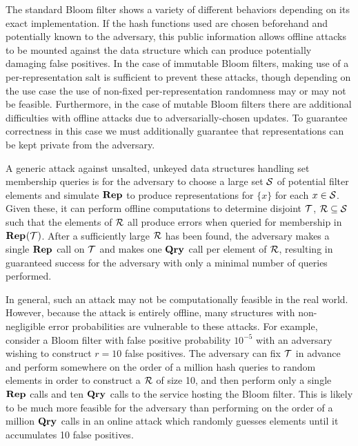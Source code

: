 
%
The standard Bloom filter shows a variety of different behaviors depending on its exact implementation. If the hash functions used are chosen beforehand and potentially known to the adversary, this public information allows offline attacks to be mounted against the data structure which can produce potentially damaging false positives. In the case of immutable Bloom filters, making use of a per-representation salt is sufficient to prevent these attacks, though depending on the use case the use of non-fixed per-representation randomness may or may not be feasible. Furthermore, in the case of mutable Bloom filters there are additional difficulties with offline attacks due to adversarially-chosen updates. To guarantee correctness in this case we must additionally guarantee that representations can be kept private from the adversary.

A generic attack against unsalted, unkeyed data structures handling set membership queries is for the adversary to choose a large set $\mathcal{S}$ of potential filter elements and simulate $\mathbf{Rep}\hspace{0.5pt}$ to produce representations for $\{x\}$ for each $x \in \mathcal{S}$. Given these, it can perform offline computations to determine disjoint $\mathcal{T}$, $\mathcal{R} \subseteq \mathcal{S}$ such that the elements of $\mathcal{R}$ all produce errors when queried for membership in $\mathbf{Rep}\hspace{0.5pt}(\mathcal{T})$. After a sufficiently large $\mathcal{R}$ has been found, the adversary makes a single $\mathbf{Rep}\hspace{0.5pt}$ call on $\mathcal{T}$ and makes one $\mathbf{Qry}\hspace{0.5pt}$ call per element of $\mathcal{R}$, resulting in guaranteed success for the adversary with only a minimal number of queries performed.

In general, such an attack may not be computationally feasible in the real world. However, because the attack is entirely offline, many structures with non-negligible error probabilities are vulnerable to these attacks. For example, consider a Bloom filter with false positive probability $10^{-5}$ with an adversary wishing to construct $r = 10$ false positives. The adversary can fix $\mathcal{T}$ in advance and perform somewhere on the order of a million hash queries to random elements in order to construct a $\mathcal{R}$ of size 10, and then perform only a single $\mathbf{Rep}\hspace{0.5pt}$ calls and ten $\mathbf{Qry}\hspace{0.5pt}$ calls to the service hosting the Bloom filter. This is likely to be much more feasible for the adversary than performing on the order of a million $\mathbf{Qry}\hspace{0.5pt}$ calls in an online attack which randomly guesses elements until it accumulates 10 false positives.


